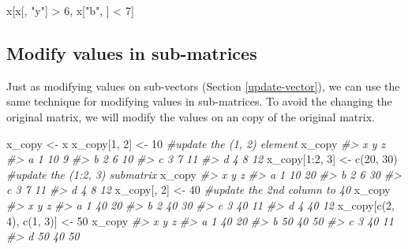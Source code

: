\documentclass[
]{book}
\newenvironment{Shaded}{\begin{snugshade}}{\end{snugshade}}
\newcommand{\CommentTok}[1]{\textcolor[rgb]{0.56,0.35,0.01}{\textit{#1}}}
\newcommand{\DecValTok}[1]{\textcolor[rgb]{0.00,0.00,0.81}{#1}}
\newcommand{\FunctionTok}[1]{\textcolor[rgb]{0.00,0.00,0.00}{#1}}
\newcommand{\NormalTok}[1]{#1}
\newcommand{\OtherTok}[1]{\textcolor[rgb]{0.56,0.35,0.01}{#1}}
\newcommand{\SpecialCharTok}[1]{\textcolor[rgb]{0.00,0.00,0.00}{#1}}
\newcommand{\StringTok}[1]{\textcolor[rgb]{0.31,0.60,0.02}{#1}}
\begin{document}
\begin{Shaded}
\begin{Highlighting}[]
\NormalTok{x[x[, }\StringTok{"y"}\NormalTok{] }\SpecialCharTok{\textgreater{}} \DecValTok{6}\NormalTok{, x[}\StringTok{"b"}\NormalTok{, ] }\SpecialCharTok{\textless{}} \DecValTok{7}\NormalTok{] }
\end{Highlighting}
\end{Shaded}

\hypertarget{modify-values-in-sub-matrices}{%
\subsection{Modify values in sub-matrices}\label{modify-values-in-sub-matrices}}

Just as modifying values on sub-vectors (Section \ref{update-vector}), we can use the same technique for modifying values in sub-matrices. To avoid the changing the original matrix, we will modify the values on an copy of the original matrix.

\begin{Shaded}
\begin{Highlighting}[]
\NormalTok{x\_copy }\OtherTok{\textless{}{-}}\NormalTok{ x}
\NormalTok{x\_copy[}\DecValTok{1}\NormalTok{, }\DecValTok{2}\NormalTok{] }\OtherTok{\textless{}{-}} \DecValTok{10}      \CommentTok{\#update the (1, 2) element}
\NormalTok{x\_copy}
\CommentTok{\#\textgreater{}   x  y  z}
\CommentTok{\#\textgreater{} a 1 10  9}
\CommentTok{\#\textgreater{} b 2  6 10}
\CommentTok{\#\textgreater{} c 3  7 11}
\CommentTok{\#\textgreater{} d 4  8 12}
\NormalTok{x\_copy[}\DecValTok{1}\SpecialCharTok{:}\DecValTok{2}\NormalTok{, }\DecValTok{3}\NormalTok{] }\OtherTok{\textless{}{-}} \FunctionTok{c}\NormalTok{(}\DecValTok{20}\NormalTok{, }\DecValTok{30}\NormalTok{)  }\CommentTok{\#update the (1:2, 3) submatrix}
\NormalTok{x\_copy}
\CommentTok{\#\textgreater{}   x  y  z}
\CommentTok{\#\textgreater{} a 1 10 20}
\CommentTok{\#\textgreater{} b 2  6 30}
\CommentTok{\#\textgreater{} c 3  7 11}
\CommentTok{\#\textgreater{} d 4  8 12}
\NormalTok{x\_copy[, }\DecValTok{2}\NormalTok{] }\OtherTok{\textless{}{-}} \DecValTok{40}     \CommentTok{\#update the 2nd column to 40}
\NormalTok{x\_copy}
\CommentTok{\#\textgreater{}   x  y  z}
\CommentTok{\#\textgreater{} a 1 40 20}
\CommentTok{\#\textgreater{} b 2 40 30}
\CommentTok{\#\textgreater{} c 3 40 11}
\CommentTok{\#\textgreater{} d 4 40 12}
\NormalTok{x\_copy[}\FunctionTok{c}\NormalTok{(}\DecValTok{2}\NormalTok{, }\DecValTok{4}\NormalTok{), }\FunctionTok{c}\NormalTok{(}\DecValTok{1}\NormalTok{, }\DecValTok{3}\NormalTok{)] }\OtherTok{\textless{}{-}} \DecValTok{50}
\NormalTok{x\_copy}
\CommentTok{\#\textgreater{}    x  y  z}
\CommentTok{\#\textgreater{} a  1 40 20}
\CommentTok{\#\textgreater{} b 50 40 50}
\CommentTok{\#\textgreater{} c  3 40 11}
\CommentTok{\#\textgreater{} d 50 40 50}
\end{Highlighting}
\end{Shaded}
\end{document}
